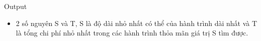 Output
\begin{itemize}
	\item 2 số nguyên S và T, S là độ dài nhỏ nhất có thể của hành trình dài nhất và T là tổng chi phí nhỏ nhất trong các hành trình thỏa mãn giá trị S tìm được.
\end{itemize}
